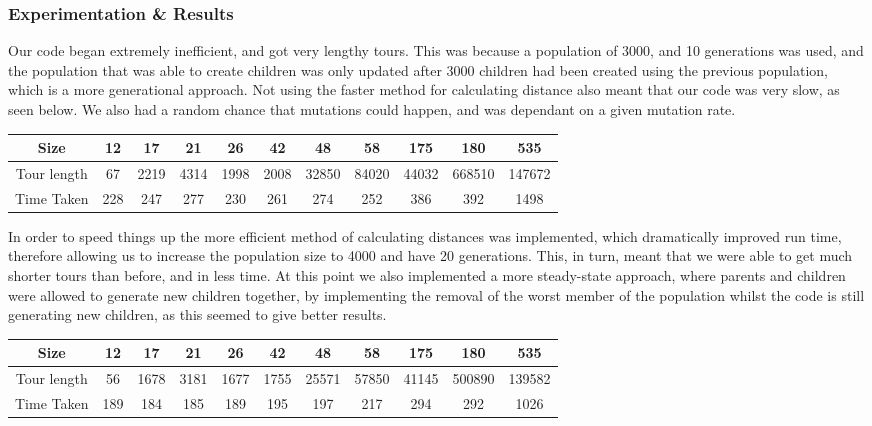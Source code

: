 \documentclass[11pt]{article}
\begin{document}
		\subsubsection*{Experimentation \& Results}
			\begin{center}
				Our code began extremely inefficient, and got very lengthy tours. This was because a population of 3000, and 10 generations was used, and the population that was able to create children was only updated after 3000 children had been created using the previous population, which is a more generational approach. Not using the faster method for calculating distance also meant that our code was very slow, as seen below. We also had a random chance that mutations could happen, and was dependant on a given mutation rate.
				\begin{tabular}{| c | c | c | c | c | c | c | c | c | c | c |}
					\hline
					Size & 12 & 17 & 21 & 26 & 42 & 48 & 58 & 175 & 180 & 535 \\
					\hline
					Tour length & 67 & 2219 & 4314 & 1998 & 2008 & 32850 & 84020 & 44032 & 668510 & 147672 \\
					\hline
					Time Taken & 228 & 247 & 277 & 230 & 261 & 274 & 252 & 386 & 392 & 1498 \\
					\hline		
				\end{tabular}
			\end{center}
		\par
		In order to speed things up the more efficient method of calculating distances was implemented, which dramatically improved run time, therefore allowing us to increase the population size to 4000 and have 20 generations. This, in turn, meant that we were able to get much shorter tours than before, and in less time. At this point we also implemented a more steady-state approach, where parents and children were allowed to generate new children together, by implementing the removal of the worst member of the population whilst the code is still generating new children, as this seemed to give better results.
			\begin{center}
				\begin{tabular}{| c | c | c | c | c | c | c | c | c | c | c |}
					\hline
					Size & 12 & 17 & 21 & 26 & 42 & 48 & 58 & 175 & 180 & 535 \\
					\hline
					Tour length & 56 & 1678 & 3181 & 1677 & 1755 & 25571 & 57850 & 41145 & 500890 & 139582 \\
					\hline
					Time Taken & 189 & 184 & 185 & 189 & 195 & 197 & 217 & 294 & 292 & 1026 \\
					\hline		
				\end{tabular}
			\end{center}
\end{document}

